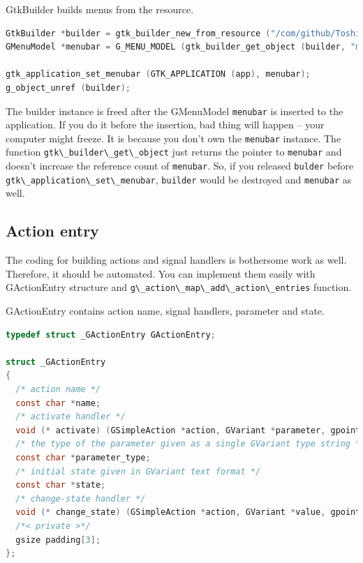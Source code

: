 GtkBuilder builds menus from the resource.

\begin{lstlisting}[language=C]
GtkBuilder *builder = gtk_builder_new_from_resource ("/com/github/ToshioCP/menu3/menu3.ui");
GMenuModel *menubar = G_MENU_MODEL (gtk_builder_get_object (builder, "menubar"));

gtk_application_set_menubar (GTK_APPLICATION (app), menubar);
g_object_unref (builder);
\end{lstlisting}

The builder instance is freed after the GMenuModel
\passthrough{\lstinline!menubar!} is inserted to the application. If you
do it before the insertion, bad thing will happen -- your computer might
freeze. It is because you don't own the
\passthrough{\lstinline!menubar!} instance. The function
\passthrough{\lstinline!gtk\_builder\_get\_object!} just returns the
pointer to \passthrough{\lstinline!menubar!} and doesn't increase the
reference count of \passthrough{\lstinline!menubar!}. So, if you
released \passthrough{\lstinline!bulder!} before
\passthrough{\lstinline!gtk\_application\_set\_menubar!},
\passthrough{\lstinline!builder!} would be destroyed and
\passthrough{\lstinline!menubar!} as well.

\subsection{Action entry}\label{action-entry}

The coding for building actions and signal handlers is bothersome work
as well. Therefore, it should be automated. You can implement them
easily with GActionEntry structure and
\passthrough{\lstinline!g\_action\_map\_add\_action\_entries!} function.

GActionEntry contains action name, signal handlers, parameter and state.

\begin{lstlisting}[language=C]
typedef struct _GActionEntry GActionEntry;

struct _GActionEntry
{
  /* action name */
  const char *name;
  /* activate handler */
  void (* activate) (GSimpleAction *action, GVariant *parameter, gpointer user_data);
  /* the type of the parameter given as a single GVariant type string */
  const char *parameter_type;
  /* initial state given in GVariant text format */
  const char *state;
  /* change-state handler */
  void (* change_state) (GSimpleAction *action, GVariant *value, gpointer user_data);
  /*< private >*/
  gsize padding[3];
};
\end{lstlisting}

